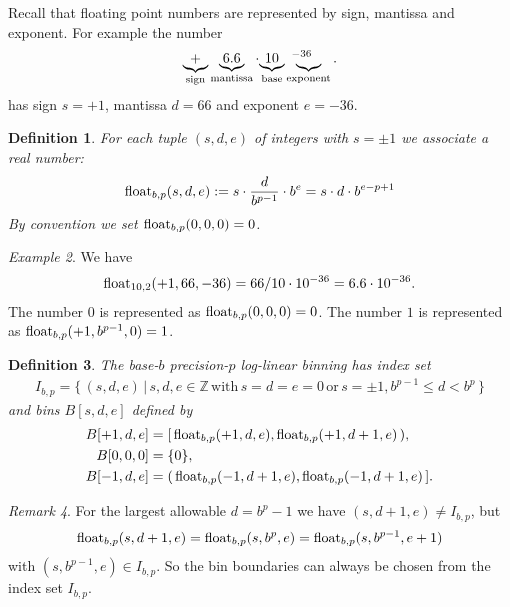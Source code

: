 \documentclass{article}
\theoremstyle{plain}
\newtheorem{definition}{Definition}[section]
\theoremstyle{remark}
\newtheorem{remark}[definition]{Remark}
\newtheorem{example}[definition]{Example}
\newcommand{\IZ}{\mathbb{Z}}
\begin{document}
Recall that floating point numbers are represented by sign, mantissa and exponent.
For example the number
\begin{align*}
  \underbrace{+}_{\text{sign}} \underbrace{6.6}_{\text{mantissa}} \cdot {\underbrace{10}_{\text{base}}\hspace{.5em}}^{-36} \hspace{-2em}\underbrace{\hspace{.5em}}_{\text{exponent}}.
\end{align*}
has sign $s=+1$, mantissa $d=66$ and exponent $e=-36$.

\begin{definition}
  For each tuple $(s,d,e)$ of integers with $s=\pm1$ we associate a real number:
  \begin{align*}
    \mathrm{float}_{b,p}(s,d,e) := s \cdot \frac{d}{b^{p-1}} \cdot b^e = s \cdot d \cdot b^{e-p+1}
  \end{align*}
  By convention we set $\mathrm{float}_{b,p}(0,0,0)=0$.
\end{definition}

\begin{example}
  We have
  \begin{align*}
    \mathrm{float}_{10,2}(+1,66,-36) = 66/10 \cdot 10^{-36}  = 6.6 \cdot 10^{-36}.
  \end{align*}
  The number $0$ is represented as $\mathrm{float}_{b,p}(0,0,0) = 0$.
  The number $1$ is represented as $\mathrm{float}_{b,p}(+1,b^{p-1},0) = 1$.
\end{example}

\begin{definition} \label{hdrdef}
  The base-$b$ precision-$p$ log-linear binning has index set
  \begin{align*}
    I_{b,p} = \{\, (s,d,e) \,|\, s,d,e \in \IZ \,\text{with}\, s=d=e=0 \,\text{or}\, s=\pm1, b^{p-1} \leq d < b^p \,\}
  \end{align*}
  and bins $B[s,d,e]$ defined by
  \begin{align*}
    B[+1,d,e] &= \mathopen[\,\mathrm{float}_{b,p}(+1,d,e), \mathrm{float}_{b,p}(+1,d+1,e)\,\mathopen), \\
    B[0,0,0]  &= \{ 0 \}, \\
    B[-1,d,e] &= \mathopen(\,\mathrm{float}_{b,p}(-1,d+1,e), \mathrm{float}_{b,p}(-1,d+1,e)\,\mathopen].
  \end{align*}
\end{definition}

\begin{remark} For the largest allowable $d=b^{p}-1$ we have $(s,d+1,e) \neq I_{b,p}$, but
  \begin{align*}
    \mathrm{float}_{b,p}(s,d + 1,e) = \mathrm{float}_{b,p}(s, b^p ,e) = \mathrm{float}_{b,p}(s, b^{p-1}, e+1)
  \end{align*}
  with $(s, b^{p-1}, e) \in I_{b,p}$.
  So the bin boundaries can always be chosen from the index set $I_{b,p}$.
\end{remark}
\end{document}
